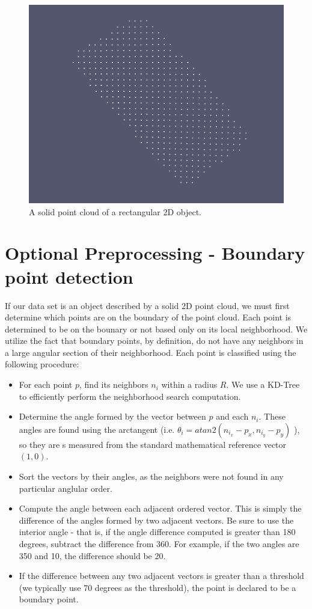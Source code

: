 \documentclass{InsightArticle}
\begin{document}
\begin{figure}[H]
  \centering
  \includegraphics[width=0.3\linewidth]{images/rectanglePoints}
  \caption{A solid point cloud of a rectangular 2D object.}
  \label{fig:SolidPointCloud}
\end{figure}

\section{Optional Preprocessing - Boundary point detection}
\label{sec:BoundaryPointDetection}
If our data set is an object described by a solid 2D point cloud, we must first determine which points are on the boundary of the point cloud. Each point is determined to be on the bounary or not based only on its local neighborhood.  We utilize the fact that boundary points, by definition, do not have any neighbors in a large angular section of their neighborhood. Each point is classified using the following procedure:

\begin{itemize}
 \item For each point $p$, find its neighbors $n_i$ within a radius $R$. We use a KD-Tree to efficiently perform the neighborhood search computation.
 \item Determine the angle formed by the vector between $p$ and each $n_i$. These angles are found using the arctangent (i.e. $\theta_i = atan2(n_{i_x} - p_x, n_{i_y} - p_y)$ ), so they are s measured from the standard mathematical reference vector $(1,0)$. 
 \item Sort the vectors by their angles, as the neighbors were not found in any particular anglular order.
 \item Compute the angle between each adjacent ordered vector. This is simply the difference of the angles formed by two adjacent vectors. Be sure to use the interior angle - that is, if the angle difference computed is greater than 180 degrees, subtract the difference from 360. For example, if the two angles are 350 and 10, the difference should be 20.
 \item If the difference between any two adjacent vectors is greater than a threshold (we typically use 70 degrees as the threshold), the point is declared to be a boundary point. 
\end{itemize}
\end{document}
